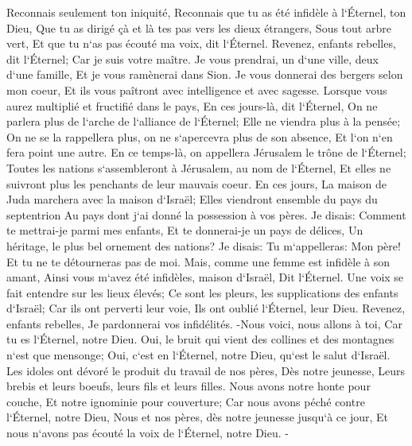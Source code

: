 \verse Reconnais seulement ton iniquité, Reconnais que tu as été infidèle à l`Éternel, ton Dieu, Que tu as dirigé çà et là tes pas vers les dieux étrangers, Sous tout arbre vert, Et que tu n`as pas écouté ma voix, dit l`Éternel. 
\verse Revenez, enfants rebelles, dit l`Éternel; Car je suis votre maître. Je vous prendrai, un d`une ville, deux d`une famille, Et je vous ramènerai dans Sion. 
\verse Je vous donnerai des bergers selon mon coeur, Et ils vous paîtront avec intelligence et avec sagesse. 
\verse Lorsque vous aurez multiplié et fructifié dans le pays, En ces jours-là, dit l`Éternel, On ne parlera plus de l`arche de l`alliance de l`Éternel; Elle ne viendra plus à la pensée; On ne se la rappellera plus, on ne s`apercevra plus de son absence, Et l`on n`en fera point une autre. 
\verse En ce temps-là, on appellera Jérusalem le trône de l`Éternel; Toutes les nations s`assembleront à Jérusalem, au nom de l`Éternel, Et elles ne suivront plus les penchants de leur mauvais coeur. 
\verse En ces jours, La maison de Juda marchera avec la maison d`Israël; Elles viendront ensemble du pays du septentrion Au pays dont j`ai donné la possession à vos pères. 
\verse Je disais: Comment te mettrai-je parmi mes enfants, Et te donnerai-je un pays de délices, Un héritage, le plus bel ornement des nations? Je disais: Tu m`appelleras: Mon père! Et tu ne te détourneras pas de moi. 
\verse Mais, comme une femme est infidèle à son amant, Ainsi vous m`avez été infidèles, maison d`Israël, Dit l`Éternel. 
\verse Une voix se fait entendre sur les lieux élevés; Ce sont les pleurs, les supplications des enfants d`Israël; Car ils ont perverti leur voie, Ils ont oublié l`Éternel, leur Dieu. 
\verse Revenez, enfants rebelles, Je pardonnerai vos infidélités. -Nous voici, nous allons à toi, Car tu es l`Éternel, notre Dieu. 
\verse Oui, le bruit qui vient des collines et des montagnes n`est que mensonge; Oui, c`est en l`Éternel, notre Dieu, qu`est le salut d`Israël. 
\verse Les idoles ont dévoré le produit du travail de nos pères, Dès notre jeunesse, Leurs brebis et leurs boeufs, leurs fils et leurs filles. 
\verse Nous avons notre honte pour couche, Et notre ignominie pour couverture; Car nous avons péché contre l`Éternel, notre Dieu, Nous et nos pères, dès notre jeunesse jusqu`à ce jour, Et nous n`avons pas écouté la voix de l`Éternel, notre Dieu. - 

